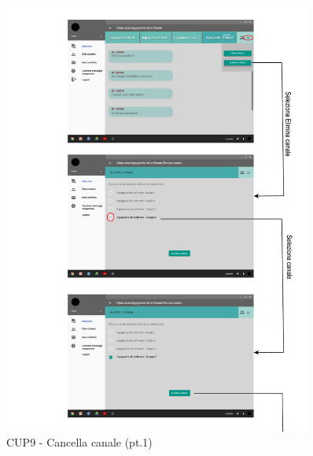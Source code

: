 \begin{figure}
	\centering
	\includegraphics[width=0.9\textwidth]{imgs/gruppo6/activities/act_cup9_cancella_canale1.pdf}
	\caption{CUP9 - Cancella canale (pt.1)}
	\label{fig:act-cup9}
\end{figure}

